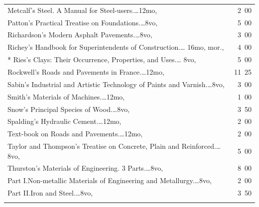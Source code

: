 \documentclass[a4paper,12pt]{book}[2004/02/16]
\theoremstyle{ilemma}
\theoremstyle{itheorem}
\theoremstyle{iother}
\theoremstyle{icorollary}
\theoremstyle{numcorollary}
\theoremstyle{idefinition}
\begin{document}
\begin{longtable}{@{}l@{ }r@{}}
Metcalf's Steel. A Manual for Steel-users.\dotfill\ldots 12mo, &2\ 00\\

Patton's Practical Treatise on Foundations.\dotfill\ldots 8vo, &5\ 00\\

Richardson's Modern Asphalt Pavements.\dotfill\ldots 8vo, &3\ 00\\

Richey's Handbook for Superintendents of Construction.\dotfill\ldots
16mo, mor., &4\ 00\\

* Ries's Clays: Their Occurrence, Properties, and Uses.\dotfill\ldots
  8vo, &5\ 00\\

Rockwell's Roads and Pavements in France.\dotfill\ldots 12mo, &11\ 25\\



Sabin's Industrial and Artistic Technology of Paints and
Varnish.\dotfill\ldots 8vo, &3\ 00\\

Smith's Materials of Machines.\dotfill\ldots 12mo, &1\ 00\\

Snow's Principal Species of Wood.\dotfill\ldots 8vo, &3\ 50\\

Spalding's Hydraulic Cement.\dotfill\ldots 12mo, &2\ 00\\

\nopagebreak

\indent Text-book on Roads and Pavements.\dotfill\ldots 12mo, &2\ 00\\

Taylor and Thompson's Treatise on Concrete, Plain and
Reinforced.\dotfill\ldots 8vo, &5\ 00\\

Thurston's Materials of Engineering. 3 Parts.\dotfill\ldots 8vo, &8\ 00\\

\nopagebreak

\indent Part I.\quad Non-metallic Materials of Engineering and
Metallurgy.\dotfill\ldots 8vo, &2\ 00\\

\nopagebreak

\indent Part II.\quad Iron and Steel.\dotfill\ldots 8vo, &3\ 50\\

\nopagebreak


\end{longtable}
\end{document}
